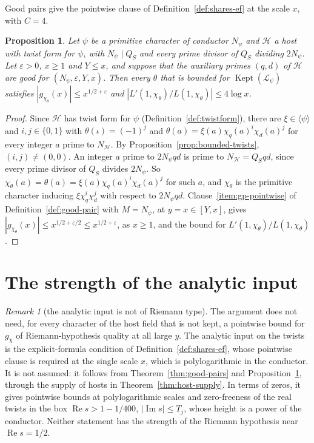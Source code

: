 \documentclass[11pt]{amsbook}
\theoremstyle{plain}
\newtheorem{proposition}[theorem]{Proposition}
\theoremstyle{definition}
\theoremstyle{remark}
\newtheorem{remark}[theorem]{Remark}
\numberwithin{equation}{section}
\numberwithin{figure}{chapter}
\numberwithin{table}{chapter}
\newcommand{\eps}{\varepsilon}
\newcommand{\lev}{\mathscr{L}}
\newcommand{\Kept}{\operatorname{Kept}}
\begin{document}
Good pairs give the pointwise clause of
Definition~\ref{def:shares-ef} at the scale $x$, with $C=4$.
\begin{figure}[tbp]
\centering

\end{figure}

\begin{proposition}\label{prop:bounded-twist-bounds}
Let $\psi$ be a primitive character of conductor $N_\psi$ and
$\mathcal H$ a host with twist form for $\psi$, with $N_\psi\mid Q_S$
and every prime divisor of $Q_S$ dividing $2N_\psi$. Let $\eps>0$,
$x\ge1$ and $Y\le x$, and suppose that the auxiliary primes $(q,d)$ of
$\mathcal H$ are good for $(N_\psi,\eps,Y,x)$. Then every $\theta$
that is bounded for $\Kept(\lev_\psi)$ satisfies
$|g_{\chi_\theta}(x)|\le x^{1/2+\eps}$ and
$|L'(1,\chi_\theta)/L(1,\chi_\theta)|\le4\log x$.
\end{proposition}

\begin{proof}
Since $\mathcal H$ has twist form for $\psi$
(Definition~\ref{def:twistform}), there are $\xi\in\langle\psi\rangle$
and $i,j\in\{0,1\}$ with $\theta(\iota)=(-1)^j$ and
$\theta(a)=\xi(a)\chi_q(a)^i\chi_d(a)^j$ for every integer $a$ prime
to $N_{\mathcal H}$. By
Proposition~\ref{prop:bounded-twists}, $(i,j)\ne(0,0)$. An integer $a$
prime to $2N_\psi qd$ is prime to $N_{\mathcal H}=Q_Sqd$, since every
prime divisor of $Q_S$ divides $2N_\psi$. So $\chi_\theta(a)=
\theta(a)=\xi(a)\chi_q(a)^i\chi_d(a)^j$ for such $a$, and
$\chi_\theta$ is the primitive character inducing
$\xi\chi_q^i\chi_d^j$ with respect to $2N_\psi qd$.
Clause~\ref{item:gp-pointwise} of
Definition~\ref{def:good-pair} with $M=N_\psi$, at $y=x\in[Y,x]$,
gives $|g_{\chi_\theta}(x)|\le x^{1/2+\eps/2}\le x^{1/2+\eps}$, as
$x\ge1$, and the bound for $L'(1,\chi_\theta)/L(1,\chi_\theta)$.
\end{proof}

\section{The strength of the analytic input}

\begin{remark}[the analytic input is not of Riemann type]
\label{rem:host-input-strength}
The argument does not need, for every character of the host field
that is not kept, a pointwise bound for $g_\chi$ of
Riemann-hypothesis quality at all large $y$. The analytic
input on the twists is the explicit-formula condition of
Definition~\ref{def:shares-ef}, whose pointwise clause is required at
the single scale $x$, which is polylogarithmic in the conductor. It is
not assumed: it follows from Theorem~\ref{thm:good-pairs} and
Proposition~\ref{prop:bounded-twist-bounds}, through the supply of
hosts in Theorem~\ref{thm:host-supply}. In terms of zeros, it gives
pointwise bounds at polylogarithmic scales and zero-freeness of the
real twists in the box $\operatorname{Re}s>1-1/400$,
$|\operatorname{Im}s|\le T_j$, whose height is a power of the
conductor. Neither statement has the strength of the Riemann
hypothesis near $\operatorname{Re}s=1/2$.
\end{remark}
\end{document}
